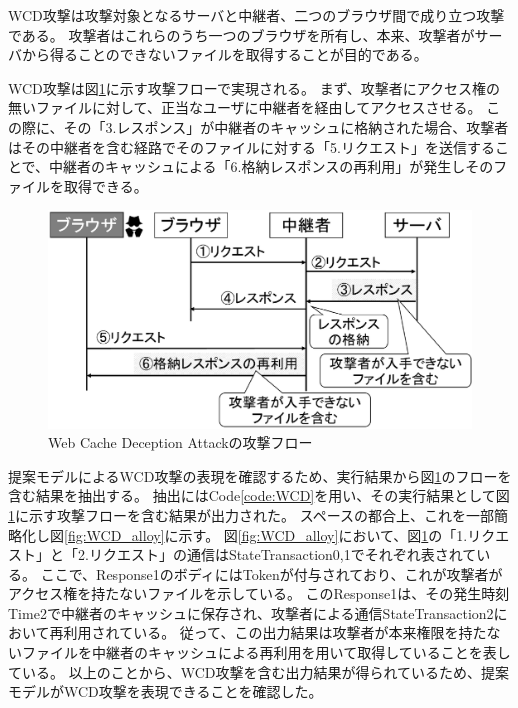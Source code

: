 \documentclass[12pt,a4paper]{jbook}
\begin{document}
WCD攻撃は攻撃対象となるサーバと中継者、二つのブラウザ間で成り立つ攻撃である。
攻撃者はこれらのうち一つのブラウザを所有し、本来、攻撃者がサーバから得ることのできないファイルを取得することが目的である。

WCD攻撃は図\ref{fig:WCD_flow}に示す攻撃フローで実現される。
まず、攻撃者にアクセス権の無いファイルに対して、正当なユーザに中継者を経由してアクセスさせる。
この際に、その「3.レスポンス」が中継者のキャッシュに格納された場合、攻撃者はその中継者を含む経路でそのファイルに対する「5.リクエスト」を送信することで、中継者のキャッシュによる「6.格納レスポンスの再利用」が発生しそのファイルを取得できる。

\begin{figure}[htb]
\centering
\includegraphics[width=450pt]{./fig/WCD_flow.eps}
\caption{Web Cache Deception Attackの攻撃フロー}
\label{fig:WCD_flow}
\end{figure}

提案モデルによるWCD攻撃の表現を確認するため、実行結果から図\ref{fig:WCD_flow}のフローを含む結果を抽出する。
抽出にはCode\ref{code:WCD}を用い、その実行結果として図\ref{fig:WCD_flow}に示す攻撃フローを含む結果が出力された。
スペースの都合上、これを一部簡略化し図\ref{fig:WCD_alloy}に示す。
図\ref{fig:WCD_alloy}において、図\ref{fig:WCD_flow}の「1.リクエスト」と「2.リクエスト」の通信はStateTransaction0,1でそれぞれ表されている。
ここで、Response1のボディにはTokenが付与されており、これが攻撃者がアクセス権を持たないファイルを示している。
このResponse1は、その発生時刻Time2で中継者のキャッシュに保存され、攻撃者による通信StateTransaction2において再利用されている。
従って、この出力結果は攻撃者が本来権限を持たないファイルを中継者のキャッシュによる再利用を用いて取得していることを表している。
以上のことから、WCD攻撃を含む出力結果が得られているため、提案モデルがWCD攻撃を表現できることを確認した。
\end{document}
